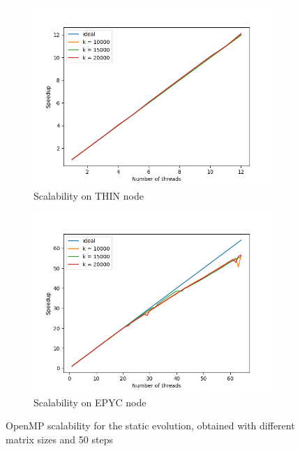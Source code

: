 \documentclass[12pt]{article}
\begin{document}
    \begin{figure}[h]
    \centering
    \begin{subfigure}[b]{0.4\textwidth}
        \includegraphics[width = \textwidth]{figs1/OpenMP_scal_THIN.png}
        \caption{Scalability on THIN node}
        \label{fig:openmp_thin}
    \end{subfigure}
    \begin{subfigure}[b]{0.4\textwidth}
        \includegraphics[width = \textwidth]{figs1/OpenMP_scal_EPYC.png}
        \caption{Scalability on EPYC node}
        \label{fig:openmp_epyc}
    \end{subfigure}
    \caption{OpenMP scalability for the static evolution, obtained with different matrix sizes and 50 steps}
    \label{fig:openmp}
    \end{figure}
    
\end{document}
